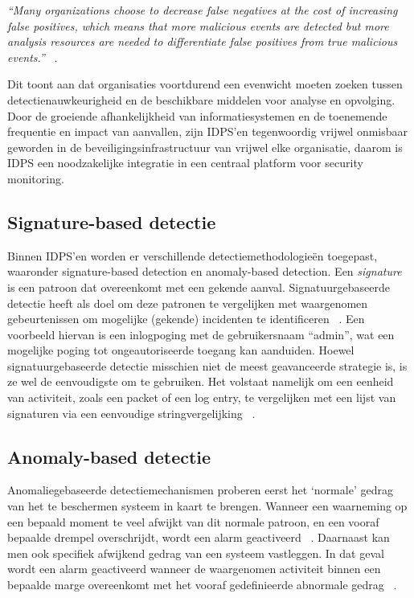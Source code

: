\textit{“Many organizations choose to decrease false negatives at the cost of increasing false positives, which means that more malicious events are detected but more analysis resources are needed to differentiate false positives from true malicious events.”} ~\autocite{Scarfone_Mell_2007}.

Dit toont aan dat organisaties voortdurend een evenwicht moeten zoeken tussen detectienauwkeurigheid en de beschikbare middelen voor analyse en opvolging. Door de groeiende afhankelijkheid van informatiesystemen en de toenemende frequentie en impact van aanvallen, zijn IDPS’en tegenwoordig vrijwel onmisbaar geworden in de beveiligingsinfrastructuur van vrijwel elke organisatie, daarom is IDPS een noodzakelijke integratie in een centraal platform voor security monitoring. 


\subsection{Signature-based detectie}
Binnen IDPS'en worden er verschillende detectiemethodologieën toegepast, waaronder signature-based detection en anomaly-based detection. Een \textit{signature} is een patroon dat overeenkomt met een gekende aanval. Signatuurgebaseerde detectie heeft als doel om deze patronen te vergelijken met waargenomen gebeurtenissen om mogelijke (gekende) incidenten te identificeren ~\autocite{Scarfone_Mell_2007}. Een voorbeeld hiervan is een inlogpoging met de gebruikersnaam ``admin'', wat een mogelijke poging tot ongeautoriseerde toegang kan aanduiden. Hoewel signatuurgebaseerde detectie misschien niet de meest geavanceerde strategie is, is ze wel de eenvoudigste om te gebruiken. Het volstaat namelijk om een eenheid van activiteit, zoals een packet of een log entry, te vergelijken met een lijst van signaturen via een eenvoudige stringvergelijking ~\autocite{Scarfone_Mell_2007}. 

\subsection{Anomaly-based detectie}
Anomaliegebaseerde detectiemechanismen proberen eerst het ‘normale’ gedrag van het te beschermen systeem in kaart te brengen. Wanneer een waarneming op een bepaald moment te veel afwijkt van dit normale patroon, en een vooraf bepaalde drempel overschrijdt, wordt een alarm geactiveerd ~\autocite{GARCIATEODORO200918}. Daarnaast kan men ook specifiek afwijkend gedrag van een systeem vastleggen. In dat geval wordt een alarm geactiveerd wanneer de waargenomen activiteit binnen een bepaalde marge overeenkomt met het vooraf gedefinieerde abnormale gedrag ~\autocite{GARCIATEODORO200918}. 

